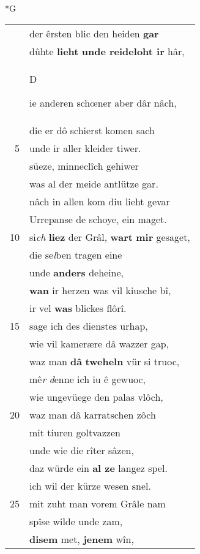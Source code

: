 \documentclass[8pt,a4paper,notitlepage]{article}
\begin{document}
\newpage
\begin{table}[ht]
\begin{minipage}[t]{0.5\linewidth}
\small
\begin{center}*G
\end{center}
\begin{tabular}{rl}
 & der êrsten blic den heiden \textbf{gar}\\ 
 & dûhte \textbf{lieht} \textbf{unde reideloht ir} hâr,\\ 
 & \begin{large}D\end{large}ie anderen schœner aber dâr nâch,\\ 
 & die er dô schierst komen sach\\ 
5 & unde ir aller kleider tiwer.\\ 
 & süeze, minneclîch gehiwer\\ 
 & was al der meide antlütze gar.\\ 
 & nâch in allen kom diu lieht gevar\\ 
 & Urrepanse de schoye, ein maget.\\ 
10 & si\textit{ch} \textbf{liez} der Grâl, \textbf{wart} \textbf{mir} gesaget,\\ 
 & die se\textit{l}ben tragen eine\\ 
 & unde \textbf{anders} deheine,\\ 
 & \textbf{wan} ir herzen was vil kiusche bî,\\ 
 & ir vel \textbf{was} blickes flôrî.\\ 
15 & sage ich des dienstes urhap,\\ 
 & wie vil kamerære dâ wazzer gap,\\ 
 & waz man \textbf{dâ} \textbf{tweheln} vür si truoc,\\ 
 & mê\textit{r} \textit{d}enne ich iu ê gewuoc,\\ 
 & wie ungevüege den palas vlôch,\\ 
20 & waz man dâ karratschen zôch\\ 
 & mit tiuren goltvazzen\\ 
 & unde wie die rîter sâzen,\\ 
 & daz würde ein \textbf{al ze} langez spel.\\ 
 & ich wil der kürze wesen snel.\\ 
25 & mit zuht man vorem Grâle nam\\ 
 & spîse wilde unde zam,\\ 
 & \textbf{disem} met, \textbf{jenem} wîn,\\ 

\end{tabular}
\end{minipage}
\end{table}
\end{document}

